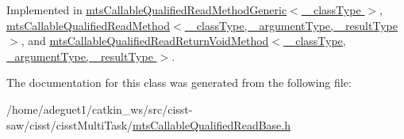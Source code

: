 Implemented in \hyperlink{classmts_callable_qualified_read_method_generic_a7c8f5ed8525397fdfeda642e0d3888d1}{mts\-Callable\-Qualified\-Read\-Method\-Generic$<$ \-\_\-class\-Type $>$}, \hyperlink{classmts_callable_qualified_read_method_a279196a1b216f18f168c98a17dc89901}{mts\-Callable\-Qualified\-Read\-Method$<$ \-\_\-class\-Type, \-\_\-argument\-Type, \-\_\-result\-Type $>$}, and \hyperlink{classmts_callable_qualified_read_return_void_method_a269843820d9e3ae43bcdd51b0c5c6190}{mts\-Callable\-Qualified\-Read\-Return\-Void\-Method$<$ \-\_\-class\-Type, \-\_\-argument\-Type, \-\_\-result\-Type $>$}.



The documentation for this class was generated from the following file\-:\begin{DoxyCompactItemize}
\item 
/home/adeguet1/catkin\-\_\-ws/src/cisst-\/saw/cisst/cisst\-Multi\-Task/\hyperlink{mts_callable_qualified_read_base_8h}{mts\-Callable\-Qualified\-Read\-Base.\-h}\end{DoxyCompactItemize}
